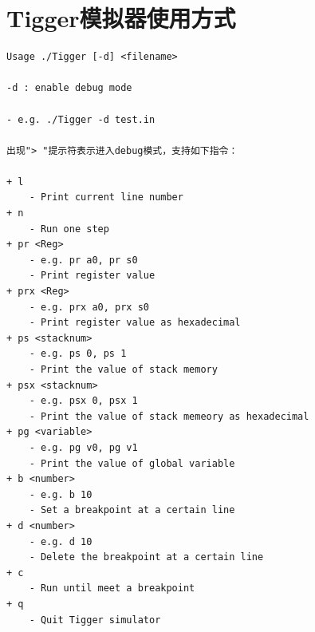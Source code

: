 \documentclass{ctexart}
\newenvironment{typewriterfont}{\ttfamily}{\par}
\begin{document}
\newpage
\section{Tigger模拟器使用方式}
\begin{typewriterfont}
\begin{lstlisting}
Usage ./Tigger [-d] <filename>

-d : enable debug mode

- e.g. ./Tigger -d test.in

出现"> "提示符表示进入debug模式，支持如下指令：

+ l
    - Print current line number
+ n
    - Run one step
+ pr <Reg>
    - e.g. pr a0, pr s0
    - Print register value
+ prx <Reg>
    - e.g. prx a0, prx s0
    - Print register value as hexadecimal
+ ps <stacknum>
    - e.g. ps 0, ps 1
    - Print the value of stack memory
+ psx <stacknum>
    - e.g. psx 0, psx 1
    - Print the value of stack memeory as hexadecimal
+ pg <variable>
    - e.g. pg v0, pg v1
    - Print the value of global variable
+ b <number>
    - e.g. b 10
    - Set a breakpoint at a certain line
+ d <number>
    - e.g. d 10
    - Delete the breakpoint at a certain line
+ c
    - Run until meet a breakpoint
+ q
    - Quit Tigger simulator
\end{lstlisting}
\end{typewriterfont}
\end{document}
